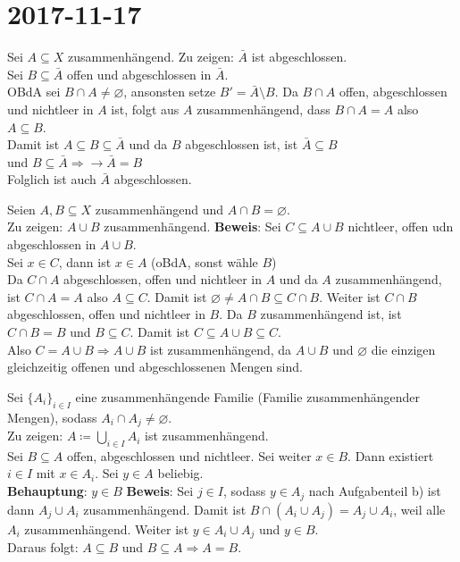\section{2017-11-17}

\begin{problem*}[1]
Sei $A \subseteq X$ zusammenhängend. Zu zeigen: $\bar{A}$ ist abgeschlossen.\\ 
Sei $B \subseteq \bar{A}$ offen und abgeschlossen in $\bar{A}$.\\
OBdA sei $B \cap A \neq \varnothing$, ansonsten setze $B' = \bar{A}\setminus B$.
Da $B \cap A$ offen, abgeschlossen und nichtleer in $A$ ist, folgt aus $A$ zusammenhängend, dass 
$B \cap A = A$ also $A \subseteq B$.\\
Damit ist $A \subseteq B \subseteq \bar{A} $ und da $ B $ abgeschlossen ist, ist $ \bar{A} \subseteq B $\\
und $B \subseteq \bar{A} \Rightarrow \rightarrow \bar{A} = B$\\
Folglich ist auch $ \bar{A} $ abgeschlossen.
\end{problem*}

\begin{problem*}[1b]
Seien $ A,B \subseteq X$ zusammenhängend und $ A \cap B = \varnothing $.\\
Zu zeigen: $ A \cup B$ zusammenhängend.
\textbf{Beweis}: Sei $C \subseteq A \cup B$ nichtleer, offen udn abgeschlossen in $ A \cup B$.\\
Sei $x \in C$, dann ist $ x \in A$ (oBdA, sonst wähle $ B $)\\
Da $C \cap A$ abgeschlossen, offen und nichtleer in $ A $ und da $ A $ zusammenhängend, ist $ C \cap A = A$
also $A \subseteq C$. Damit ist $\varnothing \neq A \cap B \subseteq C \cap B$. Weiter ist $C \cap B$ abgeschlossen, offen und nichtleer in $ B $. Da $ B $ zusammenhängend ist, ist $ C \cap B = B$ und $B \subseteq C$. Damit ist $C \subseteq A \cup B \subseteq C$.\\
Also $C = A \cup B \Rightarrow A \cup B$ ist zusammenhängend, da $ A \cup B $ und $\varnothing$ die einzigen gleichzeitig offenen und abgeschlossenen Mengen sind.  

\end{problem*}

\begin{problem*}[1c]
Sei $ \{ A_i \}_{i \in I}$ eine zusammenhängende Familie (Familie zusammenhängender Mengen), sodass 
$ A_i \cap A_j \neq \varnothing$.\\ 
Zu zeigen: $A \coloneqq \bigcup_{ i \in I } A_i$ ist zusammenhängend.\\
Sei $B \subseteq A$ offen, abgeschlossen und nichtleer. Sei weiter $x \in B$. Dann existiert $i \in I$ mit
$x \in A_i$. Sei $y \in A$ beliebig.\\
\textbf{Behauptung}: $y \in B$
\textbf{Beweis}: Sei $ j \in I$, sodass $ y \in A_j$ nach Aufgabenteil b) ist dann $ A_j \cup A_i $ zusammenhängend. Damit ist $ B \cap (A_i \cup A_j) = A_j \cup A_i $, weil alle $ A_i $ zusammenhängend.
Weiter ist $y \in A_i \cup A_j$ und $ y \in B $.\\
Daraus folgt: $A \subseteq B $ und $ B \subseteq A \Rightarrow A = B$.
\end{problem*}

